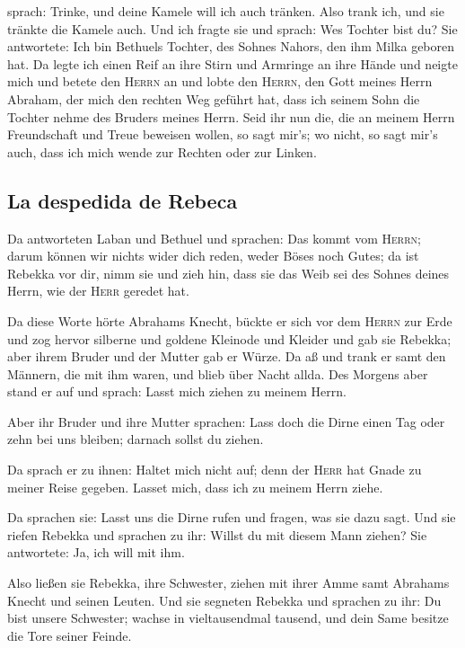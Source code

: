sprach: Trinke, und deine Kamele will ich auch tränken. Also trank ich,
und sie tränkte die Kamele auch.  Und ich fragte sie und
sprach: Wes Tochter bist du? Sie antwortete: Ich bin Bethuels Tochter,
des Sohnes Nahors, den ihm Milka geboren hat. Da legte ich einen Reif an
ihre Stirn und Armringe an ihre Hände  und neigte mich
und betete den \textsc{Herrn} an und lobte den \textsc{Herrn}, den Gott
meines Herrn Abraham, der mich den rechten Weg geführt hat, dass ich
seinem Sohn die Tochter nehme des Bruders meines Herrn. 
Seid ihr nun die, die an meinem Herrn Freundschaft und Treue beweisen
wollen, so sagt mir's; wo nicht, so sagt mir's auch, dass ich mich wende
zur Rechten oder zur Linken.

\hypertarget{la-despedida-de-rebeca}{%
\subsection{La despedida de Rebeca}\label{la-despedida-de-rebeca}}

 Da antworteten Laban und Bethuel und sprachen: Das kommt
vom \textsc{Herrn}; darum können wir nichts wider dich reden, weder
Böses noch Gutes;  da ist Rebekka vor dir, nimm sie und
zieh hin, dass sie das Weib sei des Sohnes deines Herrn, wie der
\textsc{Herr} geredet hat.

 Da diese Worte hörte Abrahams Knecht, bückte er sich vor
dem \textsc{Herrn} zur Erde  und zog hervor silberne und
goldene Kleinode und Kleider und gab sie Rebekka; aber ihrem Bruder und
der Mutter gab er Würze.  Da aß und trank er samt den
Männern, die mit ihm waren, und blieb über Nacht allda. Des Morgens aber
stand er auf und sprach: Lasst mich ziehen zu meinem Herrn.

 Aber ihr Bruder und ihre Mutter sprachen: Lass doch die
Dirne einen Tag oder zehn bei uns bleiben; darnach sollst du ziehen.

 Da sprach er zu ihnen: Haltet mich nicht auf; denn der
\textsc{Herr} hat Gnade zu meiner Reise gegeben. Lasset mich, dass ich
zu meinem Herrn ziehe.

 Da sprachen sie: Lasst uns die Dirne rufen und fragen,
was sie dazu sagt.  Und sie riefen Rebekka und sprachen
zu ihr: Willst du mit diesem Mann ziehen? Sie antwortete: Ja, ich will
mit ihm.

 Also ließen sie Rebekka, ihre Schwester, ziehen mit
ihrer Amme samt Abrahams Knecht und seinen Leuten.  Und
sie segneten Rebekka und sprachen zu ihr: Du bist unsere Schwester;
wachse in vieltausendmal tausend, und dein Same besitze die Tore seiner
Feinde.

